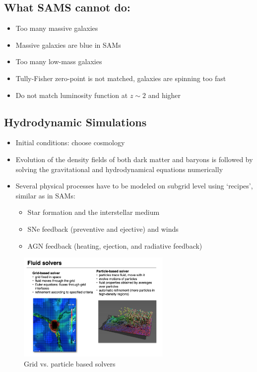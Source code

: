 \documentclass{article}
\begin{document}
\subsection{What SAMS cannot do:}

\begin{itemize}
    \item Too many massive galaxies
    \item Massive galaxies are blue in SAMs
    \item Too many low-mass galaxies
    \item Tully-Fisher zero-point is not matched, galaxies are spinning too fast
    \item Do not match luminosity function at $z\sim2$ and higher
\end{itemize}

\subsection{Hydrodynamic Simulations}

\begin{itemize}
    \item Initial conditions: choose cosmology
    \item Evolution of the density fields of both dark matter and baryons is followed by solving the gravitational and hydrodynamical equations numerically
    \item Several physical processes have to be modeled on subgrid level using ‘recipes’, similar as in SAMs:
    \begin{itemize}
        \item Star formation and the interstellar medium
        \item SNe feedback (preventive and ejective) and winds
        \item AGN feedback (heating, ejection, and radiative feedback)
    \end{itemize}
\end{itemize}

\begin{figure}
    \centering
    \includegraphics[width=0.66\textwidth]{figs/Screen Shot 2021-11-17 at 10.50.09 AM.png}
    \caption{Grid vs. particle based solvers}
    \label{fig:grids_and_particles}
\end{figure}
\end{document}
